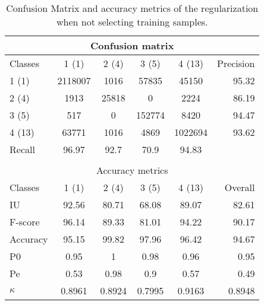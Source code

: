 \begin{table}[H]
\begin{center}
\footnotesize
\begin{tabular}{|l|c|c|c|c|r|}
\hline
\multicolumn{6}{|c|}{Confusion matrix} \\
\hline
 Classes & 1 (1) & 2 (4) & 3 (5) & 4 (13) & Precision \\
\hline
1 (1) & 2118007 & 1016 & 57835 & 45150 & 95.32 \\
\hline
2 (4) & 1913 & 25818 & 0 & 2224 & 86.19 \\
\hline
3 (5) & 517 & 0 & 152774 & 8420 & 94.47 \\
\hline
4 (13) & 63771 & 1016 & 4869 & 1022694 & 93.62 \\
\hline
Recall & 96.97 & 92.7 & 70.9 & 94.83 &  \\
\hline
\multicolumn{6}{c}{ } \\
\hline
\multicolumn{6}{|c|}{Accuracy metrics} \\
\hline
 Classes & 1 (1) & 2 (4) & 3 (5) & 4 (13) & Overall \\
\hline
IU & 92.56 & 80.71 & 68.08 & 89.07 & 82.61 \\
\hline
F-score & 96.14 & 89.33 & 81.01 & 94.22 & 90.17 \\
\hline
Accuracy & 95.15 & 99.82 & 97.96 & 96.42 & 94.67 \\
\hline
P0 & 0.95 & 1 & 0.98 & 0.96 & 0.95 \\
\hline
Pe & 0.53 & 0.98 & 0.9 & 0.57 & 0.49 \\
\hline
$\kappa$ & 0.8961 & 0.8924 & 0.7995 & 0.9163 & 0.8948 \\
\hline
\end{tabular}
\caption{Confusion Matrix and accuracy metrics of the regularization when not selecting training samples.}
\label{table:C3_S3_ss3_regul_without_training}
\end{center}
\end{table}